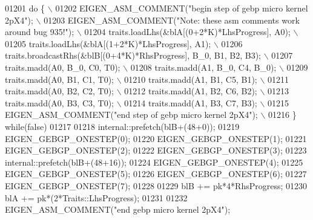 \begin{DoxyCode}
01201 \textcolor{preprocessor}{            do \{                                                                \(\backslash\)}
01202 \textcolor{preprocessor}{              EIGEN\_ASM\_COMMENT("begin step of gebp micro kernel 2pX4");        \(\backslash\)}
01203 \textcolor{preprocessor}{              EIGEN\_ASM\_COMMENT("Note: these asm comments work around bug 935!"); \(\backslash\)}
01204 \textcolor{preprocessor}{              traits.loadLhs(&blA[(0+2*K)*LhsProgress], A0);                    \(\backslash\)}
01205 \textcolor{preprocessor}{              traits.loadLhs(&blA[(1+2*K)*LhsProgress], A1);                    \(\backslash\)}
01206 \textcolor{preprocessor}{              traits.broadcastRhs(&blB[(0+4*K)*RhsProgress], B\_0, B1, B2, B3);  \(\backslash\)}
01207 \textcolor{preprocessor}{              traits.madd(A0, B\_0, C0, T0);                                     \(\backslash\)}
01208 \textcolor{preprocessor}{              traits.madd(A1, B\_0, C4, B\_0);                                    \(\backslash\)}
01209 \textcolor{preprocessor}{              traits.madd(A0, B1,  C1, T0);                                     \(\backslash\)}
01210 \textcolor{preprocessor}{              traits.madd(A1, B1,  C5, B1);                                     \(\backslash\)}
01211 \textcolor{preprocessor}{              traits.madd(A0, B2,  C2, T0);                                     \(\backslash\)}
01212 \textcolor{preprocessor}{              traits.madd(A1, B2,  C6, B2);                                     \(\backslash\)}
01213 \textcolor{preprocessor}{              traits.madd(A0, B3,  C3, T0);                                     \(\backslash\)}
01214 \textcolor{preprocessor}{              traits.madd(A1, B3,  C7, B3);                                     \(\backslash\)}
01215 \textcolor{preprocessor}{              EIGEN\_ASM\_COMMENT("end step of gebp micro kernel 2pX4");          \(\backslash\)}
01216 \textcolor{preprocessor}{            \} while(false)}
01217             
01218             internal::prefetch(blB+(48+0));
01219             EIGEN\_GEBGP\_ONESTEP(0);
01220             EIGEN\_GEBGP\_ONESTEP(1);
01221             EIGEN\_GEBGP\_ONESTEP(2);
01222             EIGEN\_GEBGP\_ONESTEP(3);
01223             internal::prefetch(blB+(48+16));
01224             EIGEN\_GEBGP\_ONESTEP(4);
01225             EIGEN\_GEBGP\_ONESTEP(5);
01226             EIGEN\_GEBGP\_ONESTEP(6);
01227             EIGEN\_GEBGP\_ONESTEP(7);
01228 
01229             blB += pk*4*RhsProgress;
01230             blA += pk*(2*Traits::LhsProgress);
01231 
01232             EIGEN\_ASM\_COMMENT(\textcolor{stringliteral}{"end gebp micro kernel 2pX4"});

\end{DoxyCode}

